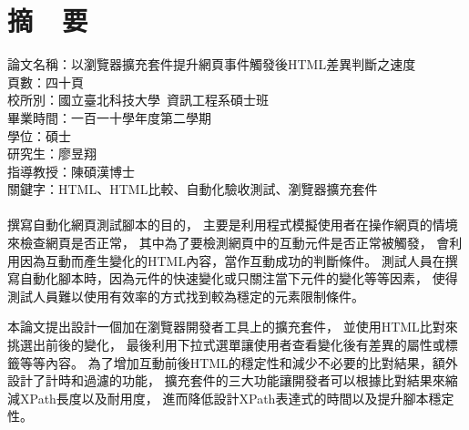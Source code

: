 \chapter*{摘~~要}


\noindent
論文名稱：以瀏覽器擴充套件提升網頁事件觸發後HTML差異判斷之速度\\
頁數：四十頁\\
校所別：國立臺北科技大學~資訊工程系碩士班\\
畢業時間：一百一十學年度第二學期\\
學位：碩士\\
研究生：廖昱翔\\
指導教授：陳碩漢博士\\
\noindent
關鍵字：HTML、HTML比較、自動化驗收測試、瀏覽器擴充套件\\
\hspace*{\fill}\\
\indent
撰寫自動化網頁測試腳本的目的，
主要是利用程式模擬使用者在操作網頁的情境來檢查網頁是否正常，
其中為了要檢測網頁中的互動元件是否正常被觸發，
會利用因為互動而產生變化的HTML內容，當作互動成功的判斷條件。
測試人員在撰寫自動化腳本時，因為元件的快速變化或只關注當下元件的變化等等因素，
使得測試人員難以使用有效率的方式找到較為穩定的元素限制條件。

本論文提出設計一個加在瀏覽器開發者工具上的擴充套件，
並使用HTML比對來挑選出前後的變化，
最後利用下拉式選單讓使用者查看變化後有差異的屬性或標籤等等內容。
為了增加互動前後HTML的穩定性和減少不必要的比對結果，額外設計了計時和過濾的功能，
擴充套件的三大功能讓開發者可以根據比對結果來縮減XPath長度以及耐用度，
進而降低設計XPath表達式的時間以及提升腳本穩定性。
